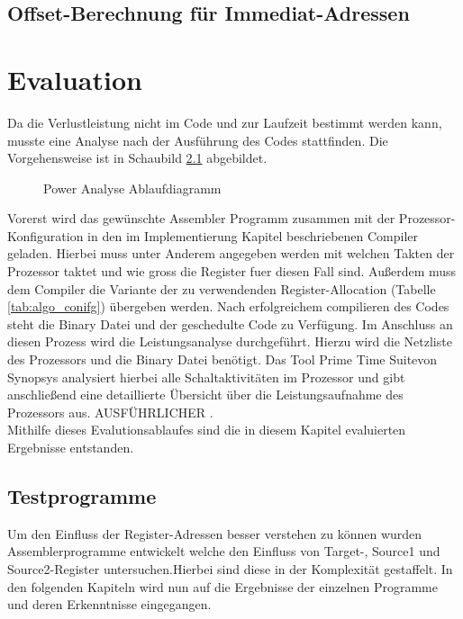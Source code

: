 \section{Offset-Berechnung für Immediat-Adressen}


\chapter{Evaluation}
\label{chap:evaluation} 
Da die Verlustleistung nicht im Code und zur Laufzeit bestimmt werden kann, musste eine Analyse nach der Ausführung des Codes stattfinden. Die Vorgehensweise ist in Schaubild \ref{fig:flow_power_analyse} abgebildet.

\begin{scriptsize}
	\begin{figure}[htbp] 
		\centering
		
		\caption{Power Analyse Ablaufdiagramm}
		\label{fig:flow_power_analyse}
	\end{figure}
\end{scriptsize}

Vorerst wird das gewünschte Assembler Programm zusammen mit der Prozessor-Konfiguration in den im Implementierung Kapitel beschriebenen Compiler geladen. Hierbei muss unter Anderem angegeben werden mit welchen Takten der Prozessor taktet und wie gross die Register fuer diesen Fall sind. Außerdem muss dem Compiler die Variante der zu verwendenden Register-Allocation (Tabelle \ref{tab:algo_conifg}) übergeben werden. Nach erfolgreichem compilieren des Codes steht die Binary Datei und der geschedulte Code zu Verfügung. Im Anschluss an diesen Prozess wird die Leistungsanalyse durchgeführt. Hierzu wird die Netzliste des Prozessors und die Binary Datei benötigt. Das Tool \glqq Prime Time Suite\grqq von Synopsys analysiert hierbei alle Schaltaktivitäten im Prozessor und gibt anschließend eine detaillierte Übersicht über die Leistungsaufnahme des Prozessors aus. AUSFÜHRLICHER .\\ 
Mithilfe dieses Evalutionsablaufes sind die in diesem Kapitel evaluierten Ergebnisse entstanden.
\section{Testprogramme}
Um den Einfluss der Register-Adressen besser verstehen zu können wurden Assemblerprogramme entwickelt welche den Einfluss von Target-, Source1 und Source2-Register untersuchen.Hierbei sind diese in der Komplexität gestaffelt. In den folgenden Kapiteln wird nun auf die Ergebnisse der einzelnen Programme und deren Erkenntnisse eingegangen.
